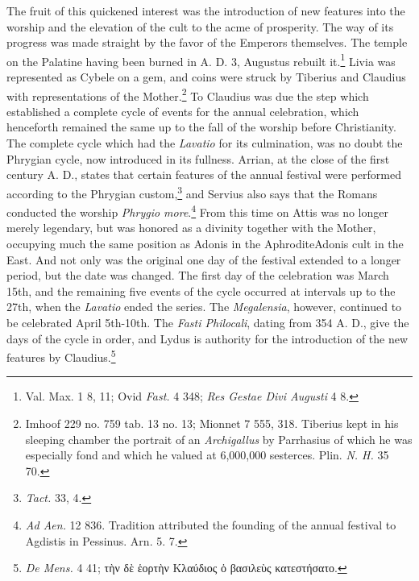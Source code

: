 \documentclass[a4paper, 11pt, oneside, polutonikogreek, english]{article}
\begin{document}
The fruit of this quickened interest was the introduction of new features into the worship and the elevation of the cult to the acme of prosperity. The way of its progress was made straight by the favor of the Emperors themselves. The temple on the Palatine having been burned in A. D. 3, Augustus rebuilt it.\footnote{Val. Max. 1 8, 11; Ovid \emph{Fast.} 4 348; \emph{Res Gestae Divi Augusti} 4 8.} Livia was represented as Cybele on a gem, and coins were struck by Tiberius and Claudius with representations of the Mother.\footnote{Imhoof 229 no. 759 tab. 13 no. 13; Mionnet 7 555, 318. Tiberius kept in his sleeping chamber the portrait of an \emph{Archigallus} by Parrhasius of which he was especially fond and which he valued at 6,000,000 sesterces. Plin. \emph{N. H.} 35 70.} To Claudius was due the step which established a complete cycle of events for the annual celebration, which henceforth remained the same up to the fall of the worship before Christianity. The complete cycle which had the \emph{Lavatio} for its culmination, was no doubt the Phrygian cycle, now introduced in its fullness. Arrian, at the close of the first century A. D., states that certain features of the annual festival were performed according to the Phrygian custom,\footnote{\emph{Tact.} 33, 4.} and Servius also says that the Romans conducted the worship \emph{Phrygio more}.\footnote{\emph{Ad Aen.} 12 836. Tradition attributed the founding of the annual festival to Agdistis in Pessinus. Arn. 5. 7.} From this time on Attis was no longer merely legendary, but was honored as a divinity together with the Mother, occupying much the same position as Adonis in the AphroditeAdonis cult in the East. And not only was the original one day of the festival extended to a longer period, but the date was changed. The first day of the celebration was March 15th, and the remaining five events of the cycle occurred at intervals up to the 27th, when the \emph{Lavatio} ended the series. The \emph{Megalensia}, however, continued to be celebrated April 5th-10th. The \emph{Fasti Philocali}, dating from 354 A. D., give the days of the cycle in order, and Lydus is authority for the introduction of the new features by Claudius.\footnote{\emph{De Mens.} 4 41; τὴν δὲ ἑορτὴν Κλαύδιος ὁ βασιλεὺς κατεστήσατο.}
\end{document}

